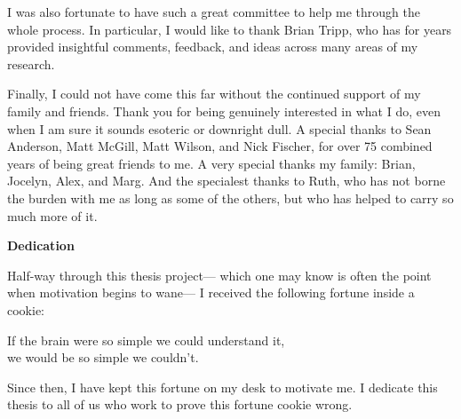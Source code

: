 I was also fortunate to have such a great committee
to help me through the whole process.
In particular, I would like to thank Brian Tripp,
who has for years provided insightful comments, feedback, and ideas
across many areas of my research.

Finally, I could not have come this far
without the continued support of my family and friends.
Thank you for being genuinely interested in what I do,
even when I am sure it sounds esoteric or downright dull.
A special thanks to Sean Anderson, Matt McGill, Matt Wilson, and Nick Fischer,
for over 75 combined years of being great friends to me.
A very special thanks my family: Brian, Jocelyn, Alex, and Marg.
And the specialest thanks to Ruth,
who has not borne the burden with me as long as some of the others,
but who has helped to carry so much more of it.


\cleardoublepage


\begin{center}\textbf{Dedication}\end{center}

\noindent
Half-way through this thesis project---%
which one may know is often the point when motivation begins to wane---%
I received the following fortune inside a cookie:
\begin{displayquote}
If the brain were so simple we could understand it,\\
we would be so simple we couldn't.
\end{displayquote}
Since then, I have kept this fortune on my desk to motivate me.
I dedicate this thesis to all of us
who work to prove this fortune cookie wrong.


\cleardoublepage

\renewcommand\contentsname{Table of Contents}
\tableofcontents
\cleardoublepage
{}

